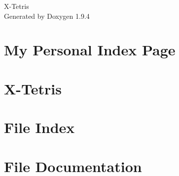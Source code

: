 \documentclass[twoside]{book}
\newcommand{\+}{\discretionary{\mbox{\scriptsize$\hookleftarrow$}}{}{}}
\newcommand{\clearemptydoublepage}{%
    \newpage{\pagestyle{empty}\cleardoublepage}%
  }
\begin{document}
  \raggedbottom
    \hypersetup{pageanchor=false,
                bookmarksnumbered=true,
                pdfencoding=unicode
               }
  \begin{titlepage}
  \vspace*{7cm}
  \begin{center}%
  {\Large X-\/\+Tetris}\\
  \vspace*{1cm}
  {\large Generated by Doxygen 1.9.4}\\
  \end{center}
  \end{titlepage}
  \clearemptydoublepage
  \tableofcontents
  \clearemptydoublepage
  \hypersetup{pageanchor=true}
\chapter{My Personal Index Page}
\label{index}\hypertarget{index}{}
\chapter{X-\/\+Tetris}
\label{md__c___users_acecchin__one_drive____sirmax__spa__documenti__m_e_g_a__x__tetris_1__r_e_a_d_m_e}

\chapter{File Index}

\chapter{File Documentation}



  \backmatter
  \newpage
  \clearemptydoublepage
  \printindex
\end{document}
